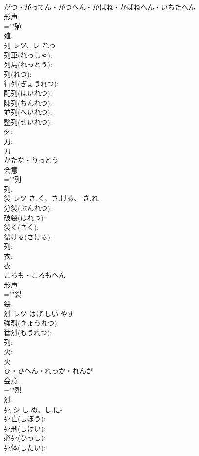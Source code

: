 \documentclass[8pt]{extreport}
\begin{document}
\begin{CJK}{UTF8}{min}
\\	がつ・がってん・がつへん・かばね・かばねへん・いちたへん	
\\	形声 
\\	=""殖.
\\	殖.
\\	列	レツ、レ		れっ	
\\	列車(れっしゃ): 
\\	列島(れっとう): 
\\	列(れつ): 
\\	行列(ぎょうれつ): 
\\	配列(はいれつ): 
\\	陳列(ちんれつ): 
\\	並列(へいれつ): 
\\	整列(せいれつ): 
\\	歹: 
\\	刀: 
\\	刀	
\\	かたな・りっとう	
\\	会意 
\\	=""列.
\\	列.
\\	裂	レツ	さ.く、さ.ける、-ぎ.れ		
\\	分裂(ぶんれつ): 
\\	破裂(はれつ): 
\\	裂く(さく): 
\\	裂ける(さける): 
\\	列: 
\\	衣: 
\\	衣	
\\	ころも・ころもへん	
\\	形声 
\\	=""裂.
\\	裂.
\\	烈	レツ	はげ.しい	やす	
\\	強烈(きょうれつ): 
\\	猛烈(もうれつ): 
\\	列: 
\\	火: 
\\	火	
\\	ひ・ひへん・れっか・れんが	
\\	会意 
\\	=""烈.
\\	烈.
\\	死	シ	し.ぬ、し.に-		
\\	死亡(しぼう): 
\\	死刑(しけい): 
\\	必死(ひっし): 
\\	死体(したい): 

\end{CJK}
\end{document}

